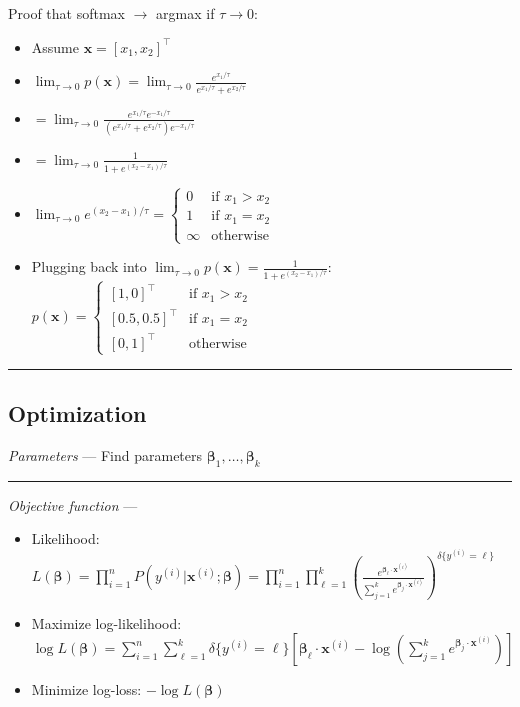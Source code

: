 Proof that softmax $\to$ argmax if $\tau \to 0$:
\begin{itemize}
    \item Assume $\boldsymbol{x} = [x_1, x_2]^\intercal$
    \item $\lim_{\tau \to 0} p(\boldsymbol{x}) = \lim_{\tau \to 0} \frac{e^{x_1 / \tau}}{e^{x_1 / \tau} + e^{x_2 / \tau}}$
    \item $= \lim_{\tau \to 0} \frac{e^{x_1 / \tau}e^{-x_1 / \tau}}{(e^{x_1 / \tau} + e^{x_2 / \tau})e^{-x_1 / \tau}}$
    \item $= \lim_{\tau \to 0} \frac{1}{1 + e^{(x_2 - x_1) / \tau}}$
    \item $\lim_{\tau \to 0} e^{(x_2 - x_1) / \tau} =
  \begin{cases}
    0 & \textrm{if } x_1 > x_2 \\
    1 & \textrm{if } x_1 = x_2 \\
    \infty & \textrm{otherwise}
  \end{cases}$
  \item Plugging back into $\lim_{\tau \to 0} p(\boldsymbol{x}) =\frac{1}{1 + e^{(x_2 - x_1) / \tau}}$:
  $
  p(\boldsymbol{x}) =
  \begin{cases}
    [1, 0]^\intercal & \textrm{if } x_1 > x_2 \\
    [0.5, 0.5]^\intercal & \textrm{if } x_1 = x_2\\
    [0, 1]^\intercal & \textrm{otherwise}
  \end{cases}
  $ 
\end{itemize}

{\color{black}\hrule height 0.001mm}

\subsection*{Optimization}
\emph{Parameters} --- Find parameters $\boldsymbol{\beta}_1, \dots, \boldsymbol{\beta}_k$

{\color{lightgray}\hrule height 0.001mm}

\emph{Objective function} --- 
\begin{itemize}
    \item Likelihood: 
    $
    L(\boldsymbol{\beta}) = \prod_{i=1}^n P(y^{(i)} | \boldsymbol{x}^{(i)}; \boldsymbol{\beta})
    = \prod_{i=1}^n \prod_{\ell=1}^k ( \frac{e^{\boldsymbol{\beta}_{\ell} \cdot \boldsymbol{x}^{(i)}}}{\sum_{j=1}^k e^{\boldsymbol{\beta}_j \cdot \boldsymbol{x}^{(i)}}} )^{\delta\{y^{(i)} = \ell\}}
    $
    \item Maximize log-likelihood:
    $
    \log L(\boldsymbol{\beta}) = \sum_{i=1}^n \sum_{\ell=1}^k \delta\{y^{(i)} = \ell\} [ \boldsymbol{\beta}_{\ell} \cdot \boldsymbol{x}^{(i)} - \log ( \sum_{j=1}^k e^{\boldsymbol{\beta}_j \cdot \boldsymbol{x}^{(i)}} ) ]
    $
    \item Minimize log-loss:
    $
    -\log L(\boldsymbol{\beta})
    $
\end{itemize}

